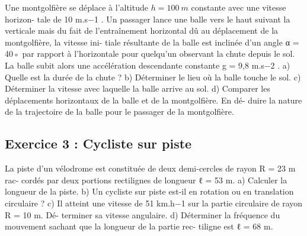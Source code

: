 Une montgolfière se déplace à l'altitude $h = \SI{100}{m}$ constante avec une vitesse horizon-
tale de 10 m.s−1 . Un passager lance une balle vers le haut suivant la verticale mais du
fait de l’entraînement horizontal dû au déplacement de la montgolfière, la vitesse ini-
tiale résultante de la balle est inclinée d’un angle α = 40◦ par rapport à l’horizontale
pour quelqu’un observant la chute depuis le sol. La balle subit alors une accélération
descendante constante g = 9,8 m.s−2 .
a) Quelle est la durée de la chute ?
b) Déterminer le lieu où la balle touche le sol.
c) Déterminer la vitesse avec laquelle la balle arrive au sol.
d) Comparer les déplacements horizontaux de la balle et de la montgolfière. En dé-
duire la nature de la trajectoire de la balle pour le passager de la montgolfière.

\subsection{Exercice 3 : Cycliste sur piste}

La piste d’un vélodrome est constituée de deux demi-cercles de rayon R = 23 m rac-
cordés par deux portions rectilignes de longueur ℓ = 53 m.
a) Calculer la longueur de la piste.
b) Un cycliste sur piste est-il en rotation ou en translation circulaire ?
c) Il atteint une vitesse de 51 km.h−1 sur la partie circulaire de rayon R = 10 m. Dé-
terminer sa vitesse angulaire.
d) Déterminer la fréquence du mouvement sachant que la longueur de la partie rec-
tiligne est ℓ = 68 m.
